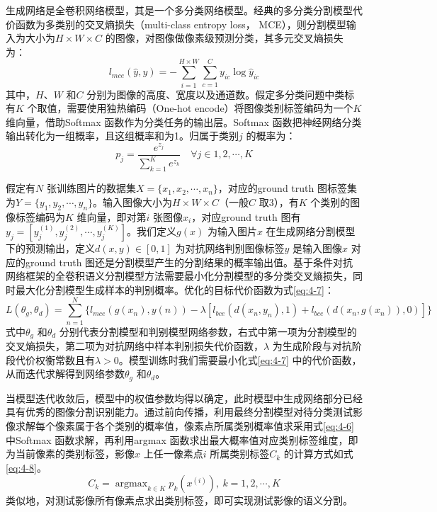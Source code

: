 生成网络是全卷积网络模型，其是一个多分类网络模型。经典的多分类分割模型代价函数为多类别的交叉熵损失（multi-class entropy loss， MCE），则分割模型输入为大小为$H\times W\times C$ 的图像，对图像做像素级预测分类，其多元交叉熵损失为：
\begin{equation}
  \label{eq:4-5}
  l_{mce} (\hat{y}, y) = -\sum_{i=1}^{H\times W}\sum_{c=1}^{C}y_{ic}\log\hat{y}_{ic}
\end{equation}
其中，$H$、$W$ 和$C$ 分别为图像的高度、宽度以及通道数。假定多分类问题中类标有$K$ 个取值，需要使用独热编码（One-hot encode）将图像类别标签编码为一个$K$ 维向量，借助Softmax 函数作为分类任务的输出层。Softmax 函数把神经网络分类输出转化为一组概率，且这组概率和为1。归属于类别$j$ 的概率为：%
\begin{equation}
  \label{eq:4-6}
  p_j = \frac{e^{z_j}}{\sum_{k=1}^Ke^{z_k}}  \quad \forall j \in 1,2,\cdots, K
\end{equation}

假定有$N$ 张训练图片的数据集$X = \{x_1,x_2,\cdots, x_n \}$，对应的ground truth 图标签集为$Y = \{y_1,y_2,\cdots, y_n \}$。输入图像大小为$H\times W\times C$（一般$C$ 取$3$），有$K$ 个类别的图像标签编码为$K$  维向量，即对第$i$ 张图像$x_i$，对应ground truth 图有$y_j = [y_j^{(1)},y_j^{(2)}, \cdots, y_j^{(K)}]$。我们定义$g(x)$ 为输入图片$x$ 在生成网络分割模型下的预测输出，定义$d(x,y)\in [0,1]$ 为对抗网络判别图像标签$y$ 是输入图像$x$ 对应的ground truth 图还是分割模型产生的分割结果的概率输出值。基于条件对抗网络框架的全卷积语义分割模型方法需要最小化分割模型的多分类交叉熵损失，同时最大化分割模型生成样本的判别概率。优化的目标代价函数为式\ref{eq:4-7}：
\begin{equation}
  \label{eq:4-7}
  L(\theta_g,\theta_d) = \sum_{n=1}^N \lbrace l_{mce} (g(x_n),y(n)) - \lambda [l_{bce} (d(x_n,y_n),1) + l_{bce}(d(x_n,g(x_n)),0)] \rbrace
\end{equation}
式中$\theta_g$ 和$\theta_d$ 分别代表分割模型和判别模型网络参数，右式中第一项为分割模型的交叉熵损失，第二项为对抗网络中样本判别损失代价函数，$\lambda$ 为生成阶段与对抗阶段代价权衡常数且有$\lambda > 0$。模型训练时我们需要最小化式\ref{eq:4-7} 中的代价函数，从而迭代求解得到网络参数$\theta_g$ 和$\theta_d$。

当模型迭代收敛后，模型中的权值参数均得以确定，此时模型中生成网络部分已经具有优秀的图像分割识别能力。通过前向传播，利用最终分割模型对待分类测试影像求解每个像素属于各个类别的概率值，像素点所属类别概率值求采用式\ref{eq:4-6} 中Softmax 函数求解，再利用argmax 函数求出最大概率值对应类别标签维度，即为当前像素的类别标签，影像$x$ 上任一像素点$i$ 所属类别标签$C_k$ 的计算方式如式\ref{eq:4-8}。
\begin{equation}
  \label{eq:4-8}
  C_k = \mathop{\arg\max}_{k \in K} p_k(x^{(i)}), \ k=1,2,\cdots,K
\end{equation}
类似地，对测试影像所有像素点求出类别标签，即可实现测试影像的语义分割。


